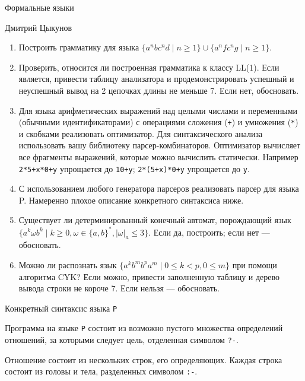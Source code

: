 \documentclass[12pt]{article}
\begin{document}
\begin{center}
{\LARGE Формальные языки}

\bigskip

{\Large Дмитрий Цыкунов}
\end{center} 

\bigskip

\begin{enumerate}
  \item Построить грамматику для языка $\{ a^n b c^n d \mid n \geq 1 \} \cup \{ a^n f c^n g \mid n \geq 1 \}$.
  \item Проверить, относится ли построенная грамматика к классу LL(1). Если является, привести таблицу анализатора и продемонстрировать успешный и неуспешный вывод на 2 цепочках длины не меньше 7. Если нет, обосновать.
  \item Для языка арифметических выражений над целыми числами и переменными (обычными идентификаторами) с операциями сложения (\verb!+!) и умножения (\verb!*!) и скобками реализовать оптимизатор. Для синтаксического анализа использовать вашу библиотеку парсер-комбинаторов. Оптимизатор вычисляет все фрагменты выражений, которые можно вычислить статически. 
  Например \verb!2*5+x*0+y! упрощается до \verb!10+y!; \verb!2*(5+x)*0+y! упрощается до \verb!y!. 
  \item С использованием любого генератора парсеров реализовать парсер для языка P. Намеренно плохое описание конкретного синтаксиса ниже.
  \item Существует ли детерминированный конечный автомат, порождающий язык $\{a^k \omega b^k \mid k \geq 0, \omega \in \{a, b\}^*, |\omega|_a \leq 3 \}$. Если да, построить; если нет --- обосновать.
  \item Можно ли распознать язык $\{a^k b^m b^p a^m \mid 0 \leq k < p, 0 \leq m\}$ при помощи алгоритма CYK? Если можно, привести заполненную таблицу и дерево вывода строки не короче 7. Если нельзя --- обосновать.
\end{enumerate}

\begin{center}
    \Large{Конкретный синтаксис языка \verb!P!}
\end{center}

Программа на языке \verb!P! состоит из возможно пустого множества определений отношений, за которыми следует цель, отделенная символом \verb!?-!.

Отношение состоит из нескольких строк, его определяющих. 
Каждая строка состоит из головы и тела, разделенных символом \verb!:-!. 
\end{document}
